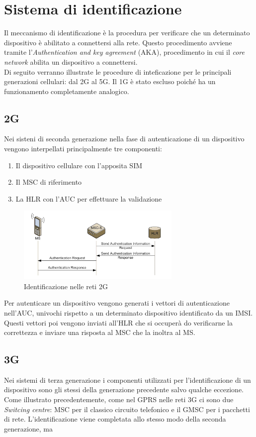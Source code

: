 \section{Sistema di identificazione}
Il meccanismo di identificazione è la procedura per verificare che un determinato dispositivo
è abilitato a connettersi alla rete.
Questo procedimento avviene tramite l'\textit{Authentication and key agreement} (AKA), procedimento in cui
il \textit{core network} abilita un dispositivo a connettersi.\\
Di seguito verranno illustrate le procedure di inteficazione per le principali generazioni cellulari: dal 2G al 5G. Il 
1G è stato escluso poiché ha un funzionamento completamente analogico.

\subsection{2G}
Nei sisteni di seconda generazione nella fase di autenticazione di un dispositivo vengono interpellati principalmente tre componenti:
\begin{enumerate}
    \item Il dispositivo cellulare con l'apposita SIM
    \item Il MSC di riferimento
    \item La HLR con l'AUC per effettuare la validazione
\end{enumerate}
\begin{figure}[ht]
    \centering
    \includegraphics[width=0.7\textwidth]{images/identification-2g.png}
    \caption{Identificazione nelle reti 2G}
\end{figure}
Per autenticare un dispositivo vengono generati i vettori di autenticazione nell'AUC, univochi rispetto a un determinato dispositivo identificato da 
un IMSI. Questi vettori poi vengono inviati all'HLR che si occuperà do verificarne la correttezza e inviare una risposta al MSC che la inoltra al MS.

\subsection{3G}
Nei sistemi di terza generazione i componenti utilizzati per l'identificazione di un dispositivo sono gli stessi della generazione precedente salvo qualche 
eccezione. Come illustrato precedentemente, come nel GPRS nelle reti 3G ci sono due \textit{Switcing centre}: MSC per il classico circuito telefonico e il GMSC per 
i pacchetti di rete. L'identificazione viene completata allo stesso modo della seconda generazione, ma 

